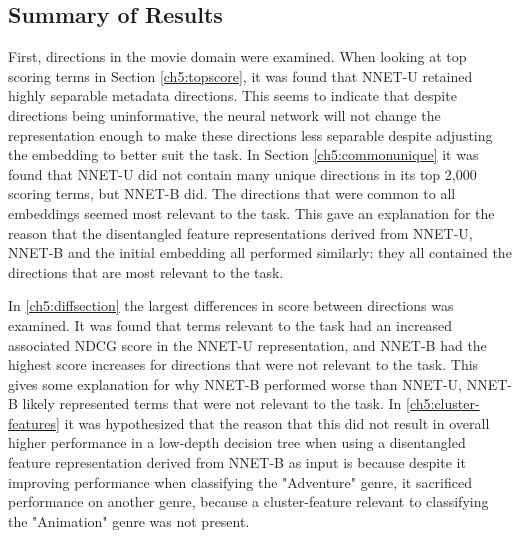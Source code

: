 













\subsection{Summary of Results}

First, directions in the movie domain were examined. When looking at top scoring terms in Section \ref{ch5:topscore}, it was found that NNET-U retained highly separable metadata directions. This seems to indicate that despite directions being uninformative, the neural network will not change the representation enough to make these directions less separable despite adjusting the embedding to better suit the task. In Section \ref{ch5:commonunique} it was found that NNET-U did not contain many unique directions in its top 2,000 scoring terms, but NNET-B did. The directions that were common to all embeddings seemed most relevant to the task. This  gave an explanation for the reason that the disentangled feature representations derived from NNET-U, NNET-B and the initial embedding all performed similarly:  they all contained the directions that are most relevant to the task. 

In \ref{ch5:diffsection} the largest differences in score between directions was examined. It was found that terms relevant to the task had an increased associated NDCG score in the NNET-U representation, and NNET-B had the highest score increases for directions that were not relevant to the task. This gives some explanation for why NNET-B performed worse than NNET-U, NNET-B likely represented terms that were not relevant to the task. In \ref{ch5:cluster-features} it was hypothesized that the reason that this did not result in overall higher performance  in a low-depth decision tree when using a disentangled feature representation derived from NNET-B as input is because despite it improving performance when classifying the "Adventure" genre, it sacrificed performance on another genre, because a cluster-feature relevant to classifying the "Animation" genre was not present. 

